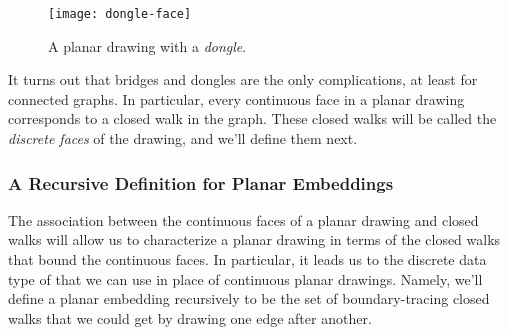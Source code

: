 \begin{figure}\redrawn

\texttt{[image: dongle-face]}

\caption{A planar drawing with a \emph{dongle}.}
\label{fig:dongle}
\end{figure}

It turns out that bridges and dongles are the only complications, at least
for connected graphs.  In particular, every continuous face in a planar
drawing corresponds to a closed walk in the graph.  These closed walks
will be called the \emph{discrete faces} of the drawing, and we'll define
them next.

\subsubsection{A Recursive Definition for Planar Embeddings}

The association between the continuous faces of a planar drawing and
closed walks will allow us to characterize a planar drawing in terms
of the closed walks that bound the continuous faces.  In particular,
it leads us to the discrete data type of 
that we can use in place of continuous planar drawings.  Namely,
we'll define a planar embedding recursively to be the set of
boundary-tracing closed walks that we could get by drawing one edge
after another.


